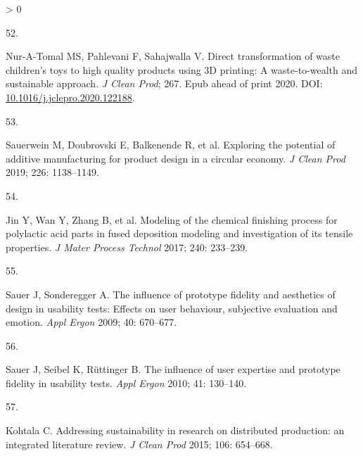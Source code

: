 \documentclass[
  12pt]{article}
\newlength{\cslhangindent}
\newlength{\csllabelwidth}
\newenvironment{CSLReferences}[2] %
 {%
  \setlength{\parindent}{0pt}
  \ifodd #1 \everypar{\setlength{\hangindent}{\cslhangindent}}\ignorespaces\fi
  \ifnum #2 > 0
  \setlength{\parskip}{#2\baselineskip}
  \fi
 }%
 {}
\newcommand{\CSLLeftMargin}[1]{\parbox[t]{\csllabelwidth}{#1}}
\newcommand{\CSLRightInline}[1]{\parbox[t]{\linewidth - \csllabelwidth}{#1}\break}
\begin{document}
\begin{CSLReferences}{0}{0}
\leavevmode\hypertarget{ref-Nur-A-Tomal2020}{}%
\CSLLeftMargin{52. }
\CSLRightInline{Nur-A-Tomal MS, Pahlevani F, Sahajwalla V. {Direct transformation of waste children's toys to high quality products using 3D printing: A waste-to-wealth and sustainable approach}. \emph{J Clean Prod}; 267. Epub ahead of print 2020. DOI: \href{https://doi.org/10.1016/j.jclepro.2020.122188}{10.1016/j.jclepro.2020.122188}.}

\leavevmode\hypertarget{ref-Sauerwein2019}{}%
\CSLLeftMargin{53. }
\CSLRightInline{Sauerwein M, Doubrovski E, Balkenende R, et al. {Exploring the potential of additive manufacturing for product design in a circular economy}. \emph{J Clean Prod} 2019; 226: 1138--1149.}

\leavevmode\hypertarget{ref-Jin2017}{}%
\CSLLeftMargin{54. }
\CSLRightInline{Jin Y, Wan Y, Zhang B, et al. {Modeling of the chemical finishing process for polylactic acid parts in fused deposition modeling and investigation of its tensile properties}. \emph{J Mater Process Technol} 2017; 240: 233--239.}

\leavevmode\hypertarget{ref-Sauer2009}{}%
\CSLLeftMargin{55. }
\CSLRightInline{Sauer J, Sonderegger A. {The influence of prototype fidelity and aesthetics of design in usability tests: Effects on user behaviour, subjective evaluation and emotion}. \emph{Appl Ergon} 2009; 40: 670--677.}

\leavevmode\hypertarget{ref-Sauer2010}{}%
\CSLLeftMargin{56. }
\CSLRightInline{Sauer J, Seibel K, Rüttinger B. {The influence of user expertise and prototype fidelity in usability tests}. \emph{Appl Ergon} 2010; 41: 130--140.}

\leavevmode\hypertarget{ref-Kohtala2015a}{}%
\CSLLeftMargin{57. }
\CSLRightInline{Kohtala C. {Addressing sustainability in research on distributed production: an integrated literature review}. \emph{J Clean Prod} 2015; 106: 654--668.}

\end{CSLReferences}
\end{document}
